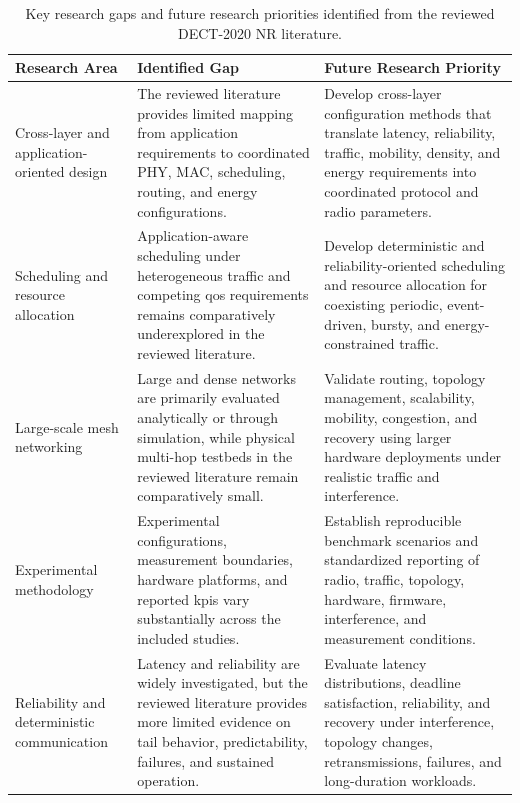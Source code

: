 \begin{table}[!t]
\centering
\caption{Key research gaps and future research priorities identified from the
reviewed DECT-2020 NR literature.}
\label{tab:research_gaps}
\renewcommand{\arraystretch}{1.12}
\small
\begin{tabular}{p{3.0cm} p{5.3cm} p{7.0cm}}
\hline
\textbf{Research Area} &
\textbf{Identified Gap} &
\textbf{Future Research Priority} \\
\hline

Cross-layer and application-oriented design & The reviewed literature provides limited mapping from application requirements to coordinated PHY, MAC, scheduling, routing, and energy configurations. & Develop cross-layer configuration methods that translate latency, reliability, traffic, mobility, density, and energy requirements into coordinated protocol and radio parameters. \\

Scheduling and resource allocation & Application-aware scheduling under heterogeneous traffic and competing \gls{qos} requirements remains comparatively underexplored in the reviewed literature. & Develop deterministic and reliability-oriented scheduling and resource allocation for coexisting periodic, event-driven, bursty, and energy-constrained traffic. \\

Large-scale mesh networking & Large and dense networks are primarily evaluated analytically or through simulation, while physical multi-hop testbeds in the reviewed literature remain comparatively small. & Validate routing, topology management, scalability, mobility, congestion, and recovery using larger hardware deployments under realistic traffic and interference. \\

Experimental methodology & Experimental configurations, measurement boundaries, hardware platforms, and reported \glspl{kpi} vary substantially across the included studies. & Establish reproducible benchmark scenarios and standardized reporting of radio, traffic, topology, hardware, firmware, interference, and measurement conditions. \\

Reliability and deterministic communication & Latency and reliability are widely investigated, but the reviewed literature provides more limited evidence on tail behavior, predictability, failures, and sustained operation. & Evaluate latency distributions, deadline satisfaction, reliability, and recovery under interference, topology changes, retransmissions, failures, and long-duration workloads. \\


\end{tabular}
\end{table}
